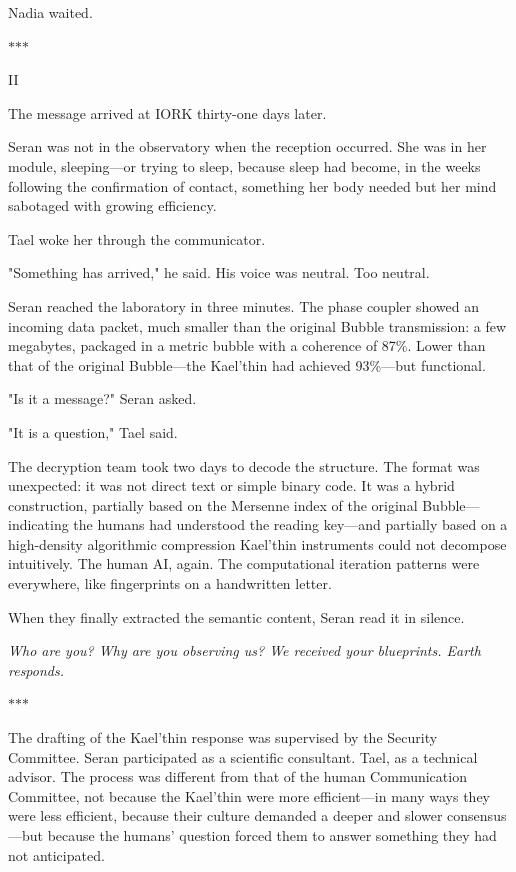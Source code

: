 \documentclass[11pt,a5paper,twoside]{book}
\begin{document}
Nadia waited.

\vspace{1.5em}
\begin{center}$\ast$\quad$\ast$\quad$\ast$\end{center}
\vspace{1.5em}

II

The message arrived at IORK thirty-one days later.

Seran was not in the observatory when the reception occurred. She was in her module, sleeping—or trying to sleep, because sleep had become, in the weeks following the confirmation of contact, something her body needed but her mind sabotaged with growing efficiency.

Tael woke her through the communicator.

"Something has arrived," he said. His voice was neutral. Too neutral.

Seran reached the laboratory in three minutes. The phase coupler showed an incoming data packet, much smaller than the original Bubble transmission: a few megabytes, packaged in a metric bubble with a coherence of 87\%. Lower than that of the original Bubble—the Kael'thin had achieved 93\%—but functional.

"Is it a message?" Seran asked.

"It is a question," Tael said.

The decryption team took two days to decode the structure. The format was unexpected: it was not direct text or simple binary code. It was a hybrid construction, partially based on the Mersenne index of the original Bubble—indicating the humans had understood the reading key—and partially based on a high-density algorithmic compression Kael'thin instruments could not decompose intuitively. The human AI, again. The computational iteration patterns were everywhere, like fingerprints on a handwritten letter.

When they finally extracted the semantic content, Seran read it in silence.

\textit{Who are you? Why are you observing us? We received your blueprints. Earth responds.}

\vspace{1.5em}
\begin{center}$\ast$\quad$\ast$\quad$\ast$\end{center}
\vspace{1.5em}

The drafting of the Kael'thin response was supervised by the Security Committee. Seran participated as a scientific consultant. Tael, as a technical advisor. The process was different from that of the human Communication Committee, not because the Kael'thin were more efficient—in many ways they were less efficient, because their culture demanded a deeper and slower consensus—but because the humans' question forced them to answer something they had not anticipated.
\end{document}
